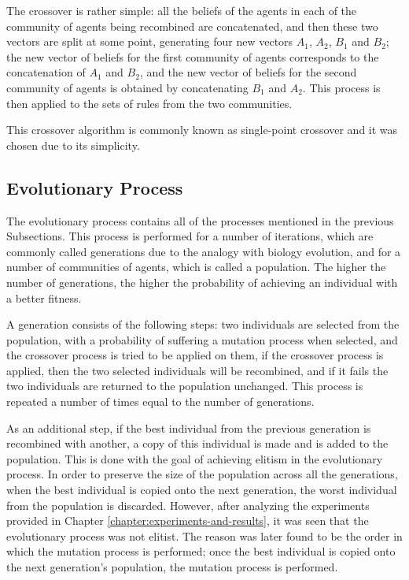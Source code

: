 The crossover is rather simple: all the beliefs of the agents in each of the
community of agents being recombined are concatenated, and then these two
vectors are split at some point, generating four new vectors $A_1$, $A_2$, $B_1$
and $B_2$; the new vector of beliefs for the first community of agents
corresponds to the concatenation of $A_1$ and $B_2$, and the new vector of
beliefs for the second community of agents is obtained by concatenating $B_1$
and $A_2$. This process is then applied to the sets of rules from the two
communities.

This crossover algorithm is commonly known as single-point crossover and it was
chosen due to its simplicity.


\subsection{Evolutionary Process}
\label{subsection:evolutionary-process}

The evolutionary process contains all of the processes mentioned in the previous
Subsections. This process is performed for a number of iterations, which are
commonly called generations due to the analogy with biology evolution, and for a
number of communities of agents, which is called a population. The higher the
number of generations, the higher the probability of achieving an individual
with a better fitness.

A generation consists of the following steps: two individuals are selected from
the population, with a probability of suffering a mutation process when
selected, and the crossover process is tried to be applied on them, if the
crossover process is applied, then the two selected individuals will be
recombined, and if it fails the two individuals are returned to the population
unchanged. This process is repeated a number of times equal to the number of
generations.

As an additional step, if the best individual from the previous generation is
recombined with another, a copy of this individual is made and is added to the
population. This is done with the goal of achieving elitism in the evolutionary
process. In order to preserve the size of the population across all the
generations, when the best individual is copied onto the next generation, the
worst individual from the population is discarded. However, after analyzing the
experiments provided in Chapter \ref{chapter:experiments-and-results}, it was
seen that the evolutionary process was not elitist. The reason was later found
to be the order in which the mutation process is performed; once the best
individual is copied onto the next generation's population, the mutation process
is performed.
